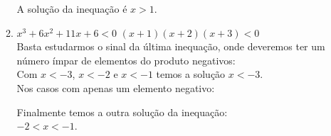 \documentclass[10pt]{book}
\begin{document}
\begin{enumerate}
\begin{enumerate}
			A solução da inequação é $x > 1$.
		\item  %
			$x^3 + 6x^2 + 11x + 6 < 0$
			$(x+1)(x+2)(x+3) < 0$
			\\
			Basta estudarmos o sinal da última inequação, onde deveremos ter um número ímpar de elementos do produto negativos:\\
			Com $x < -3$, $x < -2$ e $x < -1$ temos a solução $x < -3$.\\
			Nos casos com apenas um elemento negativo:
			Finalmente temos a outra solução da inequação:\\
			$-2 < x < -1$.


\end{enumerate}
\end{enumerate}
\end{document}

